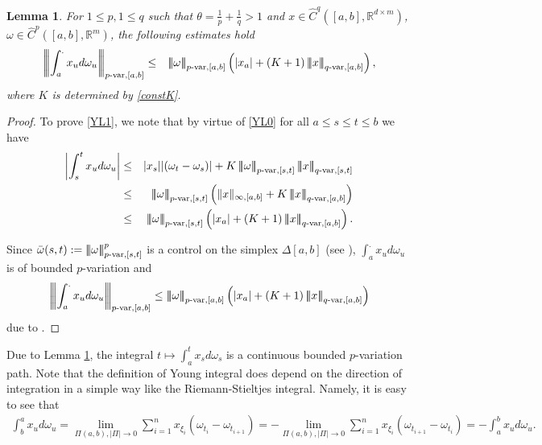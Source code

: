 \documentclass[10pt]{article}
\numberwithin{equation}{section} %
\newcommand{\R}{\ensuremath{\mathbb{R}}}
\newcommand{\ltn}{\ensuremath{\left| \! \left| \! \left|}}
\newcommand{\rtn}{\ensuremath{\right| \! \right| \! \right|}}
\newtheorem{lemma}[theorem]{Lemma}
\begin{document}
\begin{lemma}\label{lemma1}
	For $1\leq p, 1\leq q$ such that $\theta = \frac{1}{p}+\frac{1}{q}>1$ and $x\in \widehat{C}^{q}([a,b],\R^{d\times m})$, $\omega\in \widehat{C}^p([a,b],\R^m)$, the following estimates hold
	\begin{eqnarray}
	\ltn\int_a^.x_ud\omega_u\rtn_{p\text{-}{\rm {var}},[a,b]}&\leq& \ltn\omega\rtn_{p\text{-}{\rm {var}},[a,b]}\left(|x_a|+(K+1)\ltn x\rtn_{q\text{-var},[a,b]}\right),\label{YL1}
	\end{eqnarray}
	where $K$ is determined by \eqref{constK}.
\end{lemma}
\begin{proof}
	To prove \eqref{YL1}, we note that by virtue of \eqref{YL0} for all $a\leq s\leq t\leq b$ we have
		\begin{eqnarray}
		\left|\int_s^tx_ud\omega_u\right|&\leq & |x_s||(\omega_t-\omega_s)|+ K\ltn\omega\rtn_{p\text{-var},[s,t]}\ltn x\rtn_{q\text{-var},[s,t]}\notag\\
		&\leq &  \ltn\omega\rtn_{p\text{-var},[s,t]}\left(\|x\|_{\infty,[a,b]} + K \ltn x\rtn_{q\text{-var},[a,b]}\right)\notag\\
		&\leq &  \ltn\omega\rtn_{p\text{-var},[s,t]}\left(|x_a|+ (K+1) \ltn x\rtn_{q\text{-var},[a,b]}\right).\notag
		\end{eqnarray}
		
		Since $\bar{\omega}(s,t):=\ltn\omega\rtn^p_{p\text{-var},[s,t]}$ is a control on the simplex $\Delta[a,b]$ (see \cite[Proposition 5.8, p. 80]{friz}), $\int_a^.x_ud\omega_u$ is of bounded $p$-variation and  
		$$\ltn\int_a^.x_ud\omega_u\rtn_{p\text{-var},[a,b]}\leq \ltn\omega\rtn_{p\text{-var},[a,b]}\left(|x_a|+(K+1)\ltn x\rtn_{q\text{-var},[a,b]}\right)$$
		due to  \cite[Proposition 5.10(i), p. 83]{friz}.%
\end{proof}
\medskip

Due to Lemma \ref{lemma1}, the integral $t\mapsto \int_a^tx_sd\omega_s$ is a continuous bounded $p$-variation path.
Note that the definition of Young integral does depend on the direction of integration in a simple way like the Riemann-Stieltjes integral. Namely, it is easy to see that
\begin{eqnarray}
\int_b^ax_ud\omega_u = \displaystyle\lim_{\Pi(a,b), |\Pi|\to 0} \sum_{i=1}^n x_{\xi_i}(\omega_{t_{i}}-\omega_{t_{i+1}}) = - \displaystyle\lim_{\Pi(a,b), |\Pi|\to 0} \sum_{i=1}^n x_{\xi_i}(\omega_{t_{i+1}}-\omega_{t_i}) = -\int_a^bx_ud\omega_u.\label{Y-integral-direction}
\end{eqnarray}
\end{document}
